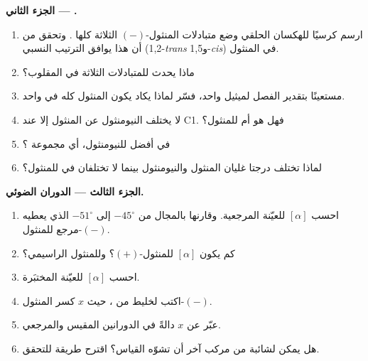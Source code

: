 \begin{problem}
\medskip
\noindent\textbf{الجزء الثاني --- .}
\begin{enumerate}[resume]
  \item ارسم كرسيًا للهكسان الحلقي وضع متبادلات
        المنثول-$(-)$ الثلاثة كلها . وتحقق من أن هذا يوافق
        الترتيب النسبي (1,2-\textit{trans} و1,5-\textit{cis})
        في المنثول.
  \item ماذا يحدث للمتبادلات الثلاثة في  المقلوب؟
  \item مستعينًا بتقدير الفصل لميثيل  واحد، فسّر
        لماذا يكاد يكون المنثول كله في  واحد.
  \item لا يختلف النيومنثول عن المنثول إلا عند C1. فهل هو  أم
         للمنثول؟
  \item في أفضل  للنيومنثول، أي مجموعة ؟
  \item لماذا تختلف درجتا غليان المنثول والنيومنثول
        بينما لا تختلفان في  للمنثول؟
\end{enumerate}

\medskip
\noindent\textbf{الجزء الثالث --- الدوران الضوئي.}
\begin{enumerate}[resume]
  \item احسب $[\alpha]$ للعيّنة المرجعية. وقارنها بالمجال
        من $-45^\circ$ إلى $-51^\circ$ الذي يعطيه مرجع للمنثول-$(-)$.
  \item كم يكون $[\alpha]$ للمنثول-$(+)$؟ وللمنثول الراسيمي؟
  \item احسب $[\alpha]$ للعيّنة المختبَرة.
  \item اكتب  لخليط من ، حيث $x$
        كسر المنثول-$(-)$.
  \item عبّر عن $x$ دالةً في الدورانين المقيس
        والمرجعي.
  \item هل يمكن لشائبة  من مركب آخر أن تشوّه
        القياس؟ اقترح طريقة للتحقق.
\end{enumerate}


\end{problem}
